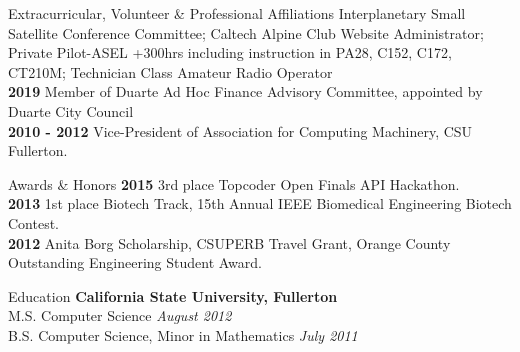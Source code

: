 \documentclass{resume} %
\begin{document}

\begin{rSection}{ Extracurricular, Volunteer \& Professional Affiliations}
{\bf} Interplanetary Small Satellite Conference Committee; Caltech Alpine Club Website Administrator; Private Pilot-ASEL +300hrs including instruction in PA28, C152, C172, CT210M; Technician Class Amateur Radio Operator \\
{\bf 2019} Member of Duarte Ad Hoc Finance Advisory Committee, appointed by Duarte City Council \\
{\bf 2010 - 2012} Vice-President of Association for Computing Machinery, CSU Fullerton. 
\end{rSection}




\begin{rSection}{Awards \& Honors}
{\bf 2015}  3rd place Topcoder Open Finals API Hackathon. \\
{\bf 2013} 1st place Biotech Track, 15th Annual IEEE Biomedical Engineering Biotech Contest. \\
{\bf 2012} Anita Borg Scholarship, CSUPERB Travel Grant, Orange County Outstanding Engineering Student Award. \\
\end{rSection}


\begin{rSection}{Education}
{\bf California State University, Fullerton}  \\ 
M.S. Computer Science \hfill {\em August 2012}\\
B.S. Computer Science, Minor in Mathematics  \hfill {\em July 2011}\\
\end{rSection}
\end{document}
